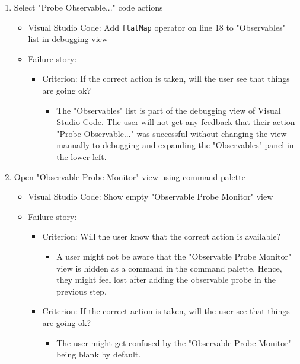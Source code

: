 \documentclass[sigplan,screen,nonacm,review]{acmart}
\begin{document}
\begin{enumerate}
	\item Select "Probe Observable..." code actions
	      \begin{itemize}
	      	\item Visual Studio Code: Add \texttt{flatMap} operator on line 18 to "Observables" list in debugging view
	      	\item Failure story:
	      	      \begin{itemize}
	      	      	\item Criterion: If the correct action is taken, will the user see that things are going ok?
	      	      	      \begin{itemize}
	      	      	      	\item The "Observables" list is part of the debugging view of Visual Studio Code. The user will not get any feedback that their action "Probe Observable..." was successful without changing the view manually to debugging and expanding the "Observables" panel in the lower left.
	      	      	      \end{itemize}
	      	      \end{itemize}
	      \end{itemize}

	\item Open "Observable Probe Monitor" view using command palette
	      \begin{itemize}
	      	\item Visual Studio Code: Show empty "Observable Probe Monitor" view
	      	\item Failure story:
	      	      \begin{itemize}
	      	      	\item Criterion: Will the user know that the correct action is available?
	      	      	      \begin{itemize}
	      	      	      	\item A user might not be aware that the "Observable Probe Monitor" view is hidden as a command in the command palette. Hence, they might feel lost after adding the observable probe in the previous step.
	      	      	      \end{itemize}
	      	      	\item Criterion: If the correct action is taken, will the user see that things are going ok?
	      	      	      \begin{itemize}
	      	      	      	\item The user might get confused by the "Observable Probe Monitor" being blank by default.
	      	      	      \end{itemize}
	      	      \end{itemize}
	      \end{itemize}


\end{enumerate}
\end{document}
